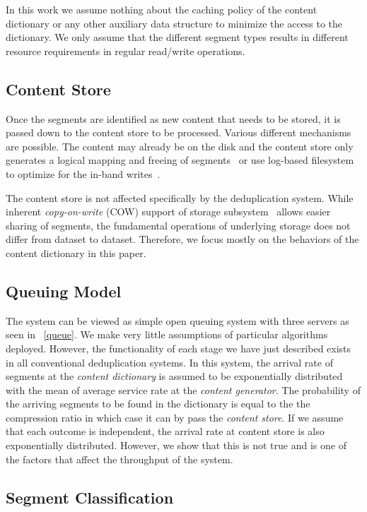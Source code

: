 In this work we assume nothing about the caching policy of the content dictionary or any other auxiliary data structure to minimize the access to the dictionary. We only assume that the different segment types results in different resource requirements in regular read/write operations. 

\subsection{Content Store}

Once the segments are identified as new content that needs to be stored, it is passed down to the content store to be processed. Various different mechanisms are possible. The content may already be on the disk and the content store only generates a logical mapping and freeing of segments~\cite{clements:2009, rhea:2008} or use log-based filesystem to optimize for the in-band writes~\cite{zhu:2008}.

The content store is not affected specifically by the deduplication system. While inherent \emph{copy-on-write} (COW) support of storage subsystem~\cite{bonwick:2003, dillon:2008} allows easier sharing of segments, the fundamental operations of underlying storage does not differ from dataset to dataset. Therefore, we focus mostly on the behaviors of the content dictionary in this paper. 

\subsection{Queuing Model}
The system can be viewed as simple open queuing system with three servers as seen in \figurename~\ref{queue}. We make very little assumptions of particular algorithms deployed. However, the functionality of each stage we have just described exists in all conventional deduplication systems. 
In this system, the arrival rate of segments at the \emph{content dictionary} is assumed to be exponentially distributed with the mean of average service rate at the \emph{content generator}. The probability of the arriving segments to be found in the dictionary is equal to the the compression ratio in which case it can by pass the \emph{content store}. If we assume that each outcome is independent, the arrival rate at content store is also exponentially distributed. However, we show that this is not true and is one of the factors that affect the throughput of the system.  

\subsection{Segment Classification}

